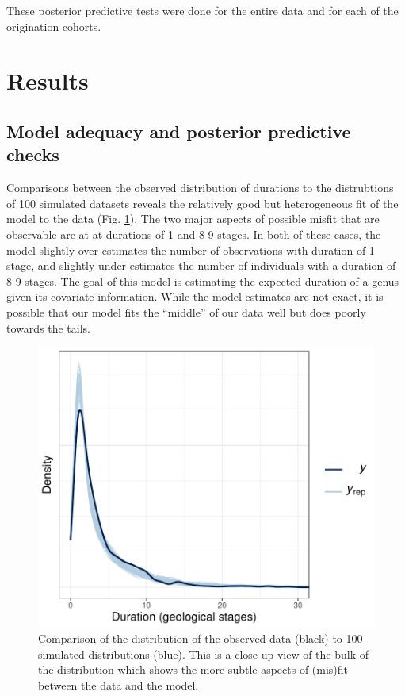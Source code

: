 \documentclass[11pt]{article}
\begin{document}
These posterior predictive tests were done for the entire data and for each of the origination cohorts.







\section*{Results}

\subsection*{Model adequacy and posterior predictive checks}

Comparisons between the observed distribution of durations to the distrubtions of 100 simulated datasets reveals the relatively good but heterogeneous fit of the model to the data (Fig. \ref{fig:dens_overlay_zoom}). The two major aspects of possible misfit that are observable are at at durations of 1 and 8-9 stages. In both of these cases, the model slightly over-estimates the number of observations with duration of 1 stage, and slightly under-estimates the number of individuals with a duration of 8-9 stages. The goal of this model is estimating the expected duration of a genus given its covariate information. While the model estimates are not exact, it is possible that our model fits the ``middle'' of our data well but does poorly towards the tails. 

\begin{figure}[ht]
  \centering
  \includegraphics[height = 0.5\textheight,width=\textwidth,keepaspectratio=true]{figure/ppc_dens_zoom_cweib_cens}
  \caption{ Comparison of the distribution of the observed data (black) to 100 simulated distributions (blue). This is a close-up view of the bulk of the distribution which shows the more subtle aspects of (mis)fit between the data and the model. }
  \label{fig:dens_overlay_zoom}
\end{figure}
\end{document}
